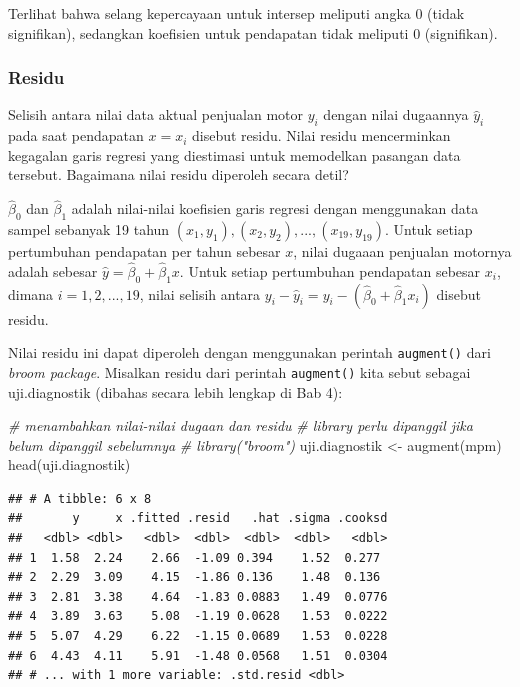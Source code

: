 \documentclass[
]{book}
\newenvironment{Shaded}{\begin{snugshade}}{\end{snugshade}}
\newcommand{\CommentTok}[1]{\textcolor[rgb]{0.56,0.35,0.01}{\textit{#1}}}
\newcommand{\FunctionTok}[1]{\textcolor[rgb]{0.00,0.00,0.00}{#1}}
\newcommand{\NormalTok}[1]{#1}
\newcommand{\OtherTok}[1]{\textcolor[rgb]{0.56,0.35,0.01}{#1}}
\begin{document}
Terlihat bahwa selang kepercayaan untuk intersep meliputi angka 0 (tidak signifikan), sedangkan koefisien untuk pendapatan tidak meliputi 0 (signifikan).

\hypertarget{residu}{%
\subsubsection{Residu}\label{residu}}

Selisih antara nilai data aktual penjualan motor \(y_i\) dengan nilai dugaannya \(\hat y_i\) pada saat pendapatan \(x = x_i\) disebut residu. Nilai residu mencerminkan kegagalan garis regresi yang diestimasi untuk memodelkan pasangan data tersebut. Bagaimana nilai residu diperoleh secara detil?

\(\hat \beta_0\) dan \(\hat \beta_1\) adalah nilai-nilai koefisien garis regresi dengan menggunakan data sampel sebanyak 19 tahun \((x_1, y_1),(x_2, y_2), . . . , (x_{19}, y_{19})\). Untuk setiap pertumbuhan pendapatan per tahun sebesar \(x\), nilai dugaaan penjualan motornya adalah sebesar \(\hat y = \hat \beta_0 + \hat \beta_1x\). Untuk setiap pertumbuhan pendapatan sebesar \(x_i\), dimana \(i = 1, 2, . . . , 19\), nilai selisih antara \(y_i−\hat y_i = y_i − (\hat \beta_0 + \hat \beta_1x_i)\) disebut residu.

Nilai residu ini dapat diperoleh dengan menggunakan perintah \texttt{augment()} dari \emph{broom package}. Misalkan residu dari perintah \texttt{augment()} kita sebut sebagai uji.diagnostik (dibahas secara lebih lengkap di Bab 4):

\begin{Shaded}
\begin{Highlighting}[]
\CommentTok{\# menambahkan nilai{-}nilai dugaan dan residu}
\CommentTok{\# library perlu dipanggil jika belum dipanggil sebelumnya}
\CommentTok{\# library("broom") }
\NormalTok{uji.diagnostik }\OtherTok{\textless{}{-}} \FunctionTok{augment}\NormalTok{(mpm)}
\FunctionTok{head}\NormalTok{(uji.diagnostik)}
\end{Highlighting}
\end{Shaded}

\begin{verbatim}
## # A tibble: 6 x 8
##       y     x .fitted .resid   .hat .sigma .cooksd
##   <dbl> <dbl>   <dbl>  <dbl>  <dbl>  <dbl>   <dbl>
## 1  1.58  2.24    2.66  -1.09 0.394    1.52  0.277 
## 2  2.29  3.09    4.15  -1.86 0.136    1.48  0.136 
## 3  2.81  3.38    4.64  -1.83 0.0883   1.49  0.0776
## 4  3.89  3.63    5.08  -1.19 0.0628   1.53  0.0222
## 5  5.07  4.29    6.22  -1.15 0.0689   1.53  0.0228
## 6  4.43  4.11    5.91  -1.48 0.0568   1.51  0.0304
## # ... with 1 more variable: .std.resid <dbl>
\end{verbatim}
\end{document}
